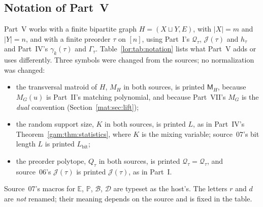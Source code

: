 \documentclass[11pt]{article}
\numberwithin{equation}{section}
\theoremstyle{definition}
\newcommand{\J}{\mathcal J(\tau)}
\newcommand{\Qt}{\mathcal Q_\tau}
\begin{document}
\subsection{Notation of Part~V}
\label{lor:sec:notation}
Part~V works with a finite bipartite graph $H=(X\sqcup Y,E)$, with $|X|=m$
and $|Y|=n$, and with a finite preorder $\tau$ on $[n]$, using Part~I's
$\Qt$, $\J$ and $h_\tau$ and Part~IV's $\gamma_k(\tau)$ and $\Gamma_\tau$.
Table~\ref{lor:tab:notation} lists what Part~V adds or uses differently.
Three symbols were changed from the sources; no normalization was changed:
\begin{itemize}[leftmargin=1.4em]
\item the transversal matroid of $H$, $M_H$ in both sources, is printed
$\mathsf M_H$, because $M_G(u)$ is Part~II's matching polynomial, and
because Part~VII's $M_G$ is the \emph{dual} convention
(Section~\ref{mat:sec:lift});
\item the random support size, $K$ in both sources, is printed $L$, as in
Part~IV's Theorem~\ref{gam:thm:statistics}, where $K$ is the mixing variable;
source~07's bit length $L$ is printed $L_{\mathrm{bit}}$;
\item the preorder polytope, $Q_\tau$ in both sources, is printed
$\Qt=\mathcal Q_\tau$, and source~06's $\mathcal J(\tau)$ is printed $\J$, as
in Part~I.
\end{itemize}
Source~07's macros for $\mathbb E$, $\mathbb P$, $\mathcal B$, $\mathcal D$ are
typeset as the host's. The letters $r$ and $d$ are \emph{not} renamed; their
meaning depends on the source and is fixed in the table.
\end{document}
